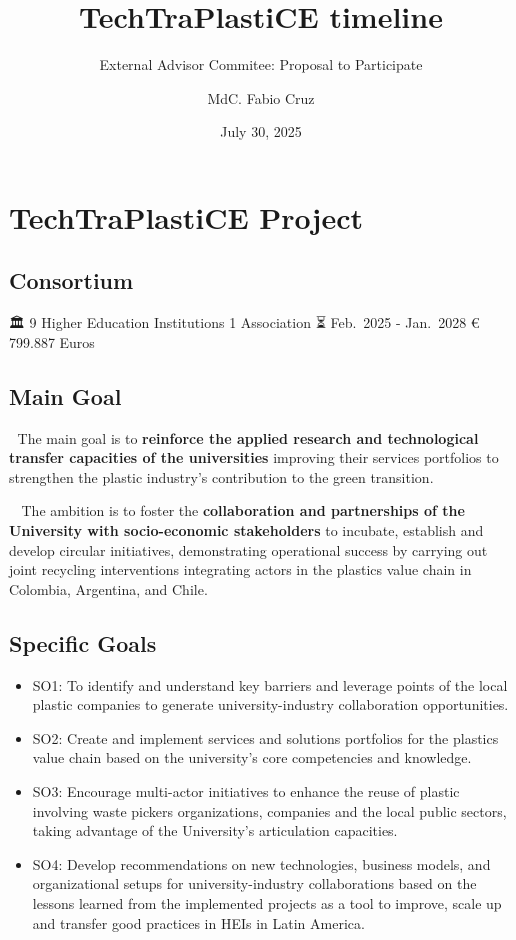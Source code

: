\documentclass[
  20px,
]{article}
\title{TechTraPlastiCE timeline}
\subtitle{External Advisor Commitee: Proposal to Participate}
\author{MdC. Fabio Cruz}
\date{July 30, 2025}
\makeatletter
\newcommand*\pandocbounded[1]{%
  \sbox\pandoc@box{#1}%
  \Gscale@div\@tempa{\textheight}{\dimexpr\ht\pandoc@box+\dp\pandoc@box\relax}%
  \Gscale@div\@tempb{\linewidth}{\wd\pandoc@box}%
  \ifdim\@tempb\p@<\@tempa\p@\let\@tempa\@tempb\fi%
  \ifdim\@tempa\p@<\p@\scalebox{\@tempa}{\usebox\pandoc@box}%
  \else\usebox{\pandoc@box}%
  \fi%
}
\makeatother
\begin{document}
\section{TechTraPlastiCE Project}\label{techtraplastice-project}

\subsection{Consortium}\label{consortium}

\pandocbounded{\texttt{[image: figures/Consorcio-flags.png]}}

🏛️ 9 Higher Education Institutions \textbar{} 1 Association ⏳ Feb.~2025
- Jan.~2028 € 799.887 Euros

\subsection{Main Goal}\label{main-goal}

🎯 The main goal is to \textbf{reinforce the applied research and
technological transfer capacities of the universities} improving their
services portfolios to strengthen the plastic industry's contribution to
the green transition.

🧩🧩 The ambition is to foster the \textbf{collaboration and
partnerships of the University with socio-economic stakeholders} to
incubate, establish and develop circular initiatives, demonstrating
operational success by carrying out joint recycling interventions
integrating actors in the plastics value chain in Colombia, Argentina,
and Chile.

\subsection{Specific Goals}\label{specific-goals}

\begin{itemize}
\item
  SO1: To identify and understand key barriers and leverage points of
  the local plastic companies to generate university-industry
  collaboration opportunities.
\item
  SO2: Create and implement services and solutions portfolios for the
  plastics value chain based on the university's core competencies and
  knowledge.
\item
  SO3: Encourage multi-actor initiatives to enhance the reuse of plastic
  involving waste pickers organizations, companies and the local public
  sectors, taking advantage of the University's articulation capacities.
\item
  SO4: Develop recommendations on new technologies, business models, and
  organizational setups for university-industry collaborations based on
  the lessons learned from the implemented projects as a tool to
  improve, scale up and transfer good practices in HEIs in Latin
  America.
\end{itemize}
\end{document}
